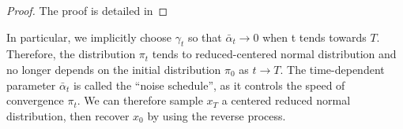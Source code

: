 \documentclass[a4paper,10pt]{article}
\theoremstyle{definition} %
\theoremstyle{definition} %
\newtheorem{proposition}[definition]{Proposition}
\theoremstyle{definition} %
\theoremstyle{definition} %
\newcommand{\R}{\mathbb{R}}
\newcommand{\0}{\boldsymbol{0}}
\begin{document}
\begin{proof}
    The proof is detailed in 
\end{proof}
In particular, we implicitly choose $\gamma_t$ so that $\bar \alpha_t \rightarrow 0$ when t tends towards $T$. Therefore, the distribution $\pi_t$ tends to reduced-centered normal distribution and no longer depends on the initial  distribution $\pi_0$ as $t \rightarrow T$. The time-dependent parameter $\bar \alpha_t$ is called the “noise schedule”, as it controls the speed of convergence $\pi_t$. We can therefore sample $x_T$ a centered reduced normal distribution, then recover $x_0$ by using the reverse process.



\end{document}
